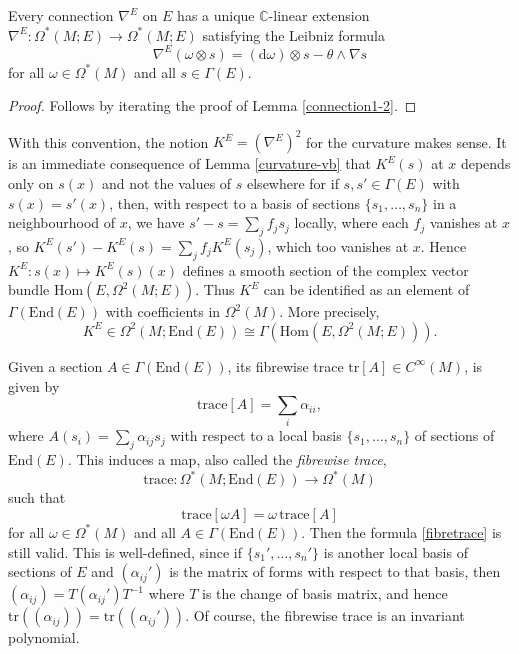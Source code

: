 \documentclass[a4paper,openany]{scrbook}
\newcommand{\ud}{\mathrm{d}}
\begin{document}
\begin{lemma}
Every connection $\nabla^E$ on $E$ has a unique $\mathbb{C}$-linear extension $\nabla^E:\Omega^*(M;E)\to\Omega^*(M;E)$ satisfying the Leibniz formula
\begin{equation}
\nabla^E(\omega\otimes s)=(\ud\omega)\otimes s-\theta\wedge\nabla s
\end{equation}
for all $\omega\in\Omega^*(M)$ and all $s\in\Gamma(E)$.
\end{lemma}
\begin{proof}
Follows by iterating the proof of Lemma \ref{connection1-2}.
\end{proof}

With this convention, the notion $K^E=(\nabla^E)^2$ for the curvature makes sense. It is an immediate consequence of Lemma \ref{curvature-vb} that $K^E(s)$ at $x$ depends only on $s(x)$ and not the values of $s$ elsewhere for if $s,s'\in\Gamma(E)$ with $s(x)=s'(x)$, then, with respect to a basis of sections $\{s_1,\dots,s_n\}$ in a neighbourhood of $x$, we have $s'-s=\sum_jf_js_j$ locally, where each $f_j$ vanishes at $x$, so $K^E(s')-K^E(s)=\sum_jf_jK^E(s_j)$, which too vanishes at $x$. Hence $K^E:s(x)\mapsto K^E(s)(x)$ defines a smooth section of the complex vector bundle $\text{Hom}(E,\Omega^2(M;E))$. Thus $K^E$ can  be identified as an element of $\Gamma(\text{End}(E))$ with coefficients in $\Omega^2(M)$. More precisely,
\begin{equation*}
K^E\in\Omega^2(M;\text{End}(E))\cong\Gamma(\text{Hom}(E,\Omega^2(M;E))).
\end{equation*}


Given a section $A\in\Gamma(\text{End}(E))$, its fibrewise trace $\text{tr}[A]\in C^\infty(M)$, is given by 
\begin{equation}\label{fibretrace}
\text{trace}[A]=\sum_i\alpha_{ii},
\end{equation}
where $A(s_i)=\sum_{j}\alpha_{ij}s_j$ with respect to a local basis $\{s_1,\dots,s_n\}$ of sections of $\text{End}(E)$. This induces a map, also called the \emph{fibrewise trace},
\begin{equation}
\text{trace}:\Omega^*(M;\text{End}(E))\to\Omega^*(M)
\end{equation}
such that
\begin{equation*}
\text{trace}[\omega A]=\omega\,\text{trace}[A]
\end{equation*}
for all $\omega\in\Omega^*(M)$ and all $A\in\Gamma(\text{End}(E))$. Then the formula \eqref{fibretrace} is still valid. This is well-defined, since if $\{s_1',\dots,s_n'\}$ is another local basis of sections of $E$ and $(\alpha_{ij}')$ is the matrix of forms with respect to that basis, then $(\alpha_{ij})=T(\alpha_{ij}')T^{-1}$ where $T$ is the change of basis matrix, and hence $\text{tr}((\alpha_{ij}))=\text{tr}((\alpha_{ij}'))$. Of course, the fibrewise trace is an invariant polynomial.
\end{document}

